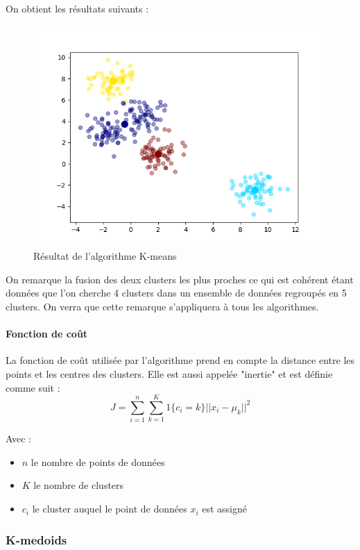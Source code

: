 \documentclass[french,a4paper,18pt]{article}
\begin{document}
On obtient les résultats suivants :
\begin{figure}[h]
    \centering
    \includegraphics[scale=0.5]{images/short_simulation_kmeans.png}
    \caption{Résultat de l'algorithme K-means}\label{fig:short_simulation_kmeans}
\end{figure}

On remarque la fusion des deux clusters les plus proches ce qui est cohérent 
étant données que l'on cherche 4 clusters dans un ensemble de données regroupés en 5 clusters.
On verra que cette remarque s'appliquera à tous les algorithmes.

\paragraph{Fonction de coût}
La fonction de coût utilisée par l'algorithme prend en compte la distance entre les points et les centres des clusters.
Elle est aussi appelée "inertie" et est définie comme suit :
\begin{equation}
    J = \sum_{i=1}^{n} \sum_{k=1}^{K} 1\{c_{i} = k\} ||x_{i} - \mu_k||^2
    \label{eq:kmeans_cost}
\end{equation}

Avec :
\begin{itemize}
    \item $n$ le nombre de points de données
    \item $K$ le nombre de clusters
    \item $c_{i}$ le cluster auquel le point de données $x_{i}$ est assigné
\end{itemize}
\subsubsection{K-medoids}
\end{document}
